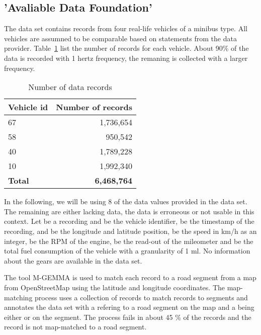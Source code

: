 \subsection{'Avaliable Data Foundation'}%
The data set contains records from four real-life vehicles of a minibus type. 
All vehicles are assumned to be comparable based on statements from the data provider. %
Table~\ref{tb:NoRecords} list the number of records for each vehicle. 
About 90\% of the data is recorded with 1 hertz frequency, the remaning is collected with a larger frequency.
\begin{table}%
\centering
\begin{tabular}{l|r}
Vehicle id		& Number of records \\\hline
67 & 1,736,654\\\hline
58 & 950,542\\\hline
40 & 1,789,228\\\hline
10 & 1,992,340\\\hline
\textbf{Total}	& \textbf{6,468,764}
\end{tabular}
\caption{Number of data records}
\label{tb:NoRecords}
\end{table}

In the following, we will be using 8 of the data values provided in the data set. 
The remaining are either lacking data, the data is erroneous or not usable in this context.
Let \rec{} be a recording and \vid{\rec{}} be the vehicle identifier, \timestamp{\rec{}} be the timestamp of the recording, \lng{\rec{}} and \lat{\rec{}} be the longitude and latitude position, \speed{\rec{}} be the speed in km/h as an integer, \rpm{\rec{}} be the RPM of the engine, \kmcounter{\rec{}} be the read-out of the mileometer and \fuel{\rec{}} be the total fuel consumption of the vehicle with a granularity of 1 ml.
No information about the gears are available in the data set. 

The tool M-GEMMA \cite{M-GEMMA} is used to match each record to a road segment from a map from OpenStreetMap\cite{OSM} using the latitude and longitude coordinates.
The map-matching process uses a collection of records to match records to segments and annotates the data set with a \segmentkey{\rec{}} refering to a road segment on the map and a \mmdirection{\rec{}} being either  or  on the segment.
The process fails in about 45 \% of the records and the record is not map-matched to a road segment. %

